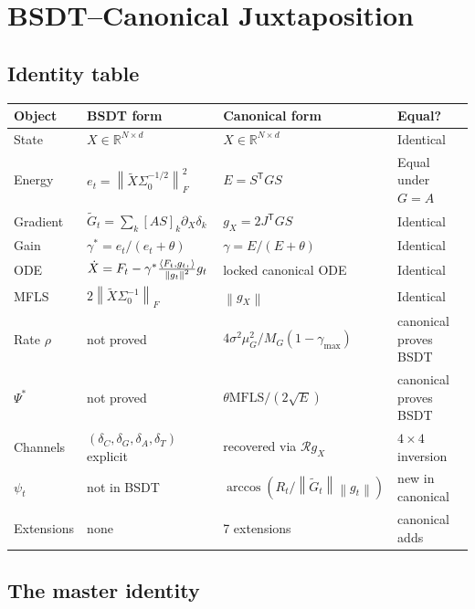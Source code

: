 \documentclass[11pt,a4paper]{article}
\theoremstyle{definition}
\newcommand{\R}{\mathbb{R}}
\newcommand{\T}{^{\mathsf{T}}}
\newcommand{\norm}[1]{\left\|#1\right\|}
\newcommand{\inner}[2]{\langle #1,\,#2\rangle}
\newcommand{\gX}{g_X}
\newcommand{\mfls}{\mathrm{MFLS}}
\begin{document}
\section{BSDT--Canonical Juxtaposition}

\subsection{Identity table}

\begin{center}
\renewcommand{\arraystretch}{1.3}
\begin{tabularx}{\textwidth}{l X X l}
\toprule
Object & BSDT form & Canonical form & Equal? \\
\midrule
State & $X \in \R^{N\times d}$ & $X \in \R^{N\times d}$ & Identical \\
Energy & $e_t = \norm{\tilde X\Sigma_0^{-1/2}}_F^2$ & $E = S\T GS$ & Equal under $G=A$ \\
Gradient & $\tilde G_t = \sum_k[AS]_k\partial_X\delta_k$ & $\gX = 2J\T GS$ & Identical \\
Gain & $\gamma^* = e_t/(e_t+\theta)$ & $\gamma = E/(E+\theta)$ & Identical \\
ODE & $\dot X = F_t - \gamma^*\frac{\inner{F_t,g_t}}{\norm{g_t}^2}g_t$ & locked canonical ODE & Identical \\
MFLS & $2\norm{\tilde X\Sigma_0^{-1}}_F$ & $\norm{\gX}$ & Identical \\
Rate $\rho$ & not proved & $4\sigma^2\mu_G^2/M_G(1-\gamma_\mathrm{max})$ & canonical proves BSDT \\
$\Psi^*$ & not proved & $\theta\mfls/(2\sqrt{E})$ & canonical proves BSDT \\
Channels & $(\delta_C,\delta_G,\delta_A,\delta_T)$ explicit & recovered via $\mathcal{R}\gX$ & $4\times4$ inversion \\
$\psi_t$ & not in BSDT & $\arccos(R_t/\norm{\tilde G_t}\norm{g_t})$ & new in canonical \\
Extensions & none & 7 extensions & canonical adds \\
\bottomrule
\end{tabularx}
\end{center}

\subsection{The master identity}
\end{document}
